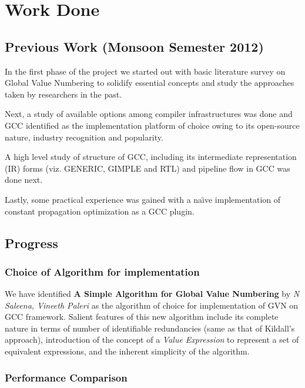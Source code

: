 \chapter{Work Done}

\section{Previous Work (Monsoon Semester 2012)}

In the first phase of the project we started out with basic literature survey on Global Value Numbering to solidify essential concepts and study the approaches taken by researchers in the past.

Next, a study of available options among compiler infrastructures was done and GCC\cite{gcc} identified as the implementation platform of choice owing to its open-source nature, industry recognition and popularity.

A high level study of structure of GCC, including its intermediate representation (IR) forms (viz. GENERIC\cite{generic}, GIMPLE\cite{gimple} and RTL\cite{rtl}) and pipeline flow in GCC was done next.

Lastly, some practical experience was gained with a na\"{\i}ve implementation of constant propagation optimization as a GCC plugin.

\section{Progress}

\subsection{Choice of Algorithm for implementation}

We have identified \textbf{A Simple Algorithm for Global Value Numbering} by \textit{N Saleena, Vineeth Paleri} as the algorithm of choice for implementation of GVN on GCC framework. Salient features of this new algorithm include its complete nature in terms of number of identifiable redundancies (same as that of Kildall's approach), introduction of the concept of a \textit{Value Expression} to represent a set of equivalent expressions, and the inherent simplicity of the algorithm.

\subsection{Performance Comparison}

